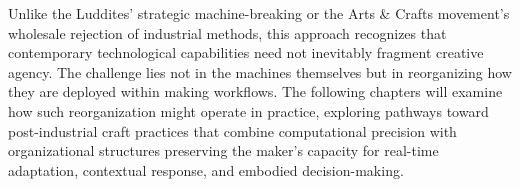 Unlike the Luddites' strategic machine-breaking or the Arts \& Crafts movement's wholesale rejection of industrial methods, this approach recognizes that contemporary technological capabilities need not inevitably fragment creative agency. The challenge lies not in the machines themselves but in reorganizing how they are deployed within making workflows. The following chapters will examine how such reorganization might operate in practice, exploring pathways toward post-industrial craft practices that combine computational precision with organizational structures preserving the maker's capacity for real-time adaptation, contextual response, and embodied decision-making.